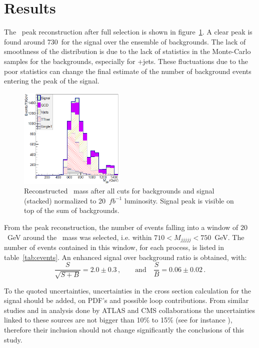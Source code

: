 \section{Results}
\label{sec:Pres}

The \Tp~peak reconstruction after full selection is shown in figure~\ref{fig:M5J}. A clear peak is found around 730~\GeVcc for the signal over the ensemble of backgrounds. The lack of smoothness of the distribution is due to the lack of statistics in the Monte-Carlo samples for the  backgrounds, especially for \W+jets. These fluctuations due to the poor statistics can change the final estimate of the number of background events entering the peak of the signal. 

\begin{figure}[!Hhtbp]
  \begin{center}
    \includegraphics[width=0.45\textwidth]{figs/Pheno/Final.png}
    \caption{Reconstructed \Tp~mass after all cuts for backgrounds and signal (stacked) normalized to 20~$fb^{-1}$ luminosity. Signal peak is visible on top of the sum of backgrounds.}
    \label{fig:M5J}
  \end{center}
\end{figure}

From the peak reconstruction, the number of events falling into a window of $20$~GeV around the \Tp~mass was selected, i.e. within $710 < M_{jjjjj} < 750$~GeV. The number of events contained in this window, for each process, is listed in table~\ref{tab:events}. An enhanced signal over background ratio is obtained, with:
\begin{equation}
\frac{S}{\sqrt{S+B}}=2.0\pm 0.3\,, \qquad \mbox{and} \quad \frac{S}{B}=0.06\pm 0.02\,. 
\end{equation}

To the quoted uncertainties, uncertainties in the cross section calculation for the signal should be added, on PDF's and possible loop contributions. From similar studies and in analysis done by ATLAS and CMS collaborations the uncertainties linked to these sources are not bigger than 10\% to 15\% (see for instance \cite{Aad:2011yn}), therefore their inclusion should not change significantly the conclusions of this study.

